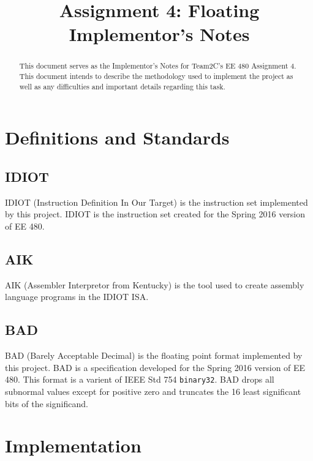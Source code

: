 \documentclass[conference]{IEEEtran}
\begin{document}
\title{Assignment 4: Floating\\Implementor's Notes}
\author{
        \IEEEauthorblockA{}
        \IEEEauthorblockA{}}

\maketitle

\begin{abstract}
This document serves as the Implementor's Notes for Team2C's EE 480 Assignment
4. This document intends to describe the methodology used to implement the 
project as well as any difficulties and important details regarding this task.
\end{abstract}

\section{Definitions and Standards}
\subsection{IDIOT}
IDIOT (Instruction Definition In Our Target) is the instruction set implemented
by this project. IDIOT is the instruction set created for the Spring 2016 
version of EE 480.\cite{idiot-isa}
\subsection{AIK}
AIK (Assembler Interpretor from Kentucky) is the tool used to create assembly
language programs in the IDIOT ISA.\cite{aik}
\subsection{BAD}
BAD (Barely Acceptable Decimal) is the floating point format implemented by
this project. BAD is a specification developed for the Spring 2016 version
of EE 480.\cite{idiot-float} This format is a varient of IEEE Std 754 
\texttt{binary32}.\cite{ieee-754} BAD drops all subnormal values except for
positive zero and truncates the 16 least significant bits of the significand.

\section{Implementation}
\end{document}
